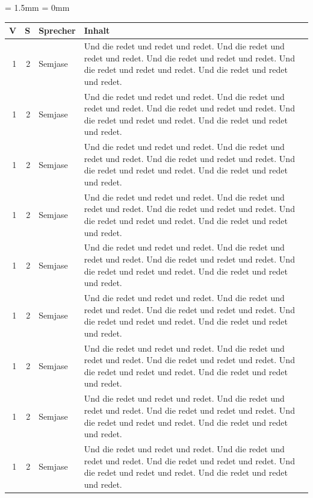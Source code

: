 \documentclass[ngerman,10pt]{book}
\begin{document}
\tabulinesep = 1.5mm
\extrarowsep = 0mm
\begin{longtabu} to \linewidth {rrlX}


\rowfont\bfseries V & S & Sprecher & Inhalt \\ \hline 
\endhead

\hline
\endfoot

\hline
\endlastfoot

1 & 2 & Semjase & Und die redet und redet und redet. Und die redet und redet und redet. Und die redet und redet und redet. Und die redet und redet und redet. Und die redet und redet und redet. \\
1 & 2 & Semjase & Und die redet und redet und redet. Und die redet und redet und redet. Und die redet und redet und redet. Und die redet und redet und redet. Und die redet und redet und redet. \\
1 & 2 & Semjase & Und die redet und redet und redet. Und die redet und redet und redet. Und die redet und redet und redet. Und die redet und redet und redet. Und die redet und redet und redet. \\
1 & 2 & Semjase & Und die redet und redet und redet. Und die redet und redet und redet. Und die redet und redet und redet. Und die redet und redet und redet. Und die redet und redet und redet. \\
1 & 2 & Semjase & Und die redet und redet und redet. Und die redet und redet und redet. Und die redet und redet und redet. Und die redet und redet und redet. Und die redet und redet und redet. \\
1 & 2 & Semjase & Und die redet und redet und redet. Und die redet und redet und redet. Und die redet und redet und redet. Und die redet und redet und redet. Und die redet und redet und redet. \\
1 & 2 & Semjase & Und die redet und redet und redet. Und die redet und redet und redet. Und die redet und redet und redet. Und die redet und redet und redet. Und die redet und redet und redet. \\
1 & 2 & Semjase & Und die redet und redet und redet. Und die redet und redet und redet. Und die redet und redet und redet. Und die redet und redet und redet. Und die redet und redet und redet. \\
1 & 2 & Semjase & Und die redet und redet und redet. Und die redet und redet und redet. Und die redet und redet und redet. Und die redet und redet und redet. Und die redet und redet und redet. \\

\end{longtabu}
\end{document}
